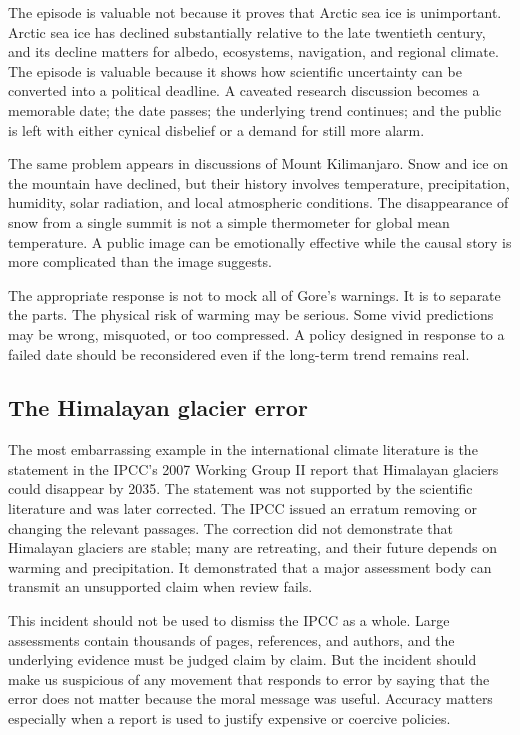 ﻿\documentclass[12pt,a4paper]{book}
\begin{document}
The episode is valuable not because it proves that Arctic sea ice is unimportant. Arctic sea ice has declined substantially relative to the late twentieth century, and its decline matters for albedo, ecosystems, navigation, and regional climate. The episode is valuable because it shows how scientific uncertainty can be converted into a political deadline. A caveated research discussion becomes a memorable date; the date passes; the underlying trend continues; and the public is left with either cynical disbelief or a demand for still more alarm.

The same problem appears in discussions of Mount Kilimanjaro. Snow and ice on the mountain have declined, but their history involves temperature, precipitation, humidity, solar radiation, and local atmospheric conditions. The disappearance of snow from a single summit is not a simple thermometer for global mean temperature. A public image can be emotionally effective while the causal story is more complicated than the image suggests.

The appropriate response is not to mock all of Gore's warnings. It is to separate the parts. The physical risk of warming may be serious. Some vivid predictions may be wrong, misquoted, or too compressed. A policy designed in response to a failed date should be reconsidered even if the long-term trend remains real.

\subsection{The Himalayan glacier error}
The most embarrassing example in the international climate literature is the statement in the IPCC's 2007 Working Group II report that Himalayan glaciers could disappear by 2035. The statement was not supported by the scientific literature and was later corrected. The IPCC issued an erratum removing or changing the relevant passages. The correction did not demonstrate that Himalayan glaciers are stable; many are retreating, and their future depends on warming and precipitation. It demonstrated that a major assessment body can transmit an unsupported claim when review fails. \cite{IPCC2007Errata}

This incident should not be used to dismiss the IPCC as a whole. Large assessments contain thousands of pages, references, and authors, and the underlying evidence must be judged claim by claim. But the incident should make us suspicious of any movement that responds to error by saying that the error does not matter because the moral message was useful. Accuracy matters especially when a report is used to justify expensive or coercive policies.
\end{document}

